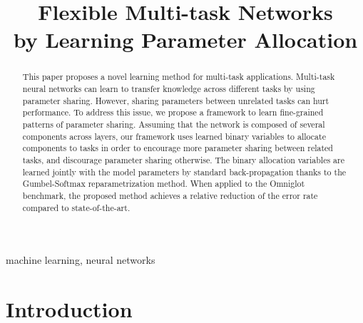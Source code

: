 \documentclass[conference]{IEEEtran}
\begin{document}
\title{Flexible Multi-task Networks\\ by Learning Parameter Allocation}

\author{
\and
{}
\and
{}
\and
{}
\and
{}
\and
{}
}



\maketitle


\begin{abstract}
This paper proposes a novel learning method for multi-task applications.
Multi-task neural networks can learn to transfer knowledge across different tasks by using parameter sharing. However, sharing parameters between unrelated tasks can hurt performance.
To address this issue, we propose a framework to learn fine-grained patterns of parameter sharing.
Assuming that the network is composed of several components across layers, our framework uses learned binary variables to allocate components to tasks in order to encourage more parameter sharing between related tasks, and discourage parameter sharing otherwise.
The binary allocation variables are learned jointly with the model parameters by standard back-propagation thanks to the Gumbel-Softmax reparametrization method.
When applied to the Omniglot benchmark, the proposed method achieves a  relative reduction of the error rate compared to  state-of-the-art.
\end{abstract}

\begin{IEEEkeywords}
machine learning, neural networks
\end{IEEEkeywords}

\section{Introduction}\label{sec:introduction}
\end{document}
